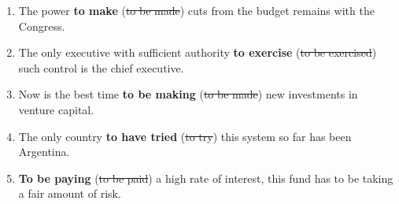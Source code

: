 \documentclass[main.tex]{subfiles}
\begin{document}
\begin{enumerate}[nosep,leftmargin=*]
	\item The power \textbf{to make} (\st{to be made}) cuts from the budget remains with the Congress.
	\item The only executive with sufficient authority \textbf{to exercise} (\st{to be exercised}) such control is the chief executive.
	\item Now is the best time \textbf{to be making} (\st{to be made}) new investments in venture capital.
	\item The only country \textbf{to have tried} (\st{to try}) this system so far has been Argentina.
	\item \textbf{To be paying} (\st{to be paid}) a high rate of interest, this fund has to be taking a fair amount of risk.
\end{enumerate}

\newpage
\setcounter{subsection}{7}

\end{document}

